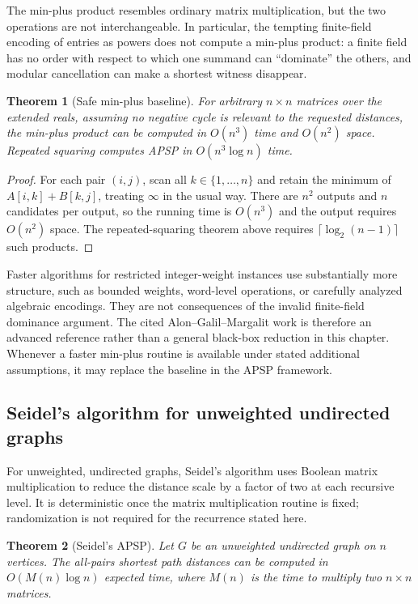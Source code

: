 \documentclass[twoside,12pt]{book}
\theoremstyle{plain}
\newtheorem{theorem}{Theorem}[chapter]
\theoremstyle{definition}
\theoremstyle{remark}
\begin{document}
The min-plus product resembles ordinary matrix multiplication, but the two
operations are not interchangeable. In particular, the tempting finite-field
encoding of entries as powers does not compute a min-plus product: a finite
field has no order with respect to which one summand can ``dominate'' the
others, and modular cancellation can make a shortest witness disappear.

\begin{theorem}[Safe min-plus baseline]
\label{thm:min-plus-baseline}
For arbitrary $n\times n$ matrices over the extended reals, assuming no
negative cycle is relevant to the requested distances, the min-plus product
can be computed in $O(n^3)$ time and $O(n^2)$ space. Repeated squaring
computes APSP in $O(n^3\log n)$ time.
\end{theorem}

\begin{proof}
For each pair $(i,j)$, scan all $k\in\{1,\ldots,n\}$ and retain the
minimum of $A[i,k]+B[k,j]$, treating $\infty$ in the usual way. There are
$n^2$ outputs and $n$ candidates per output, so the running time is
$O(n^3)$ and the output requires $O(n^2)$ space. The repeated-squaring
theorem above requires $\lceil\log_2(n-1)\rceil$ such products.
\end{proof}

Faster algorithms for restricted integer-weight instances use substantially
more structure, such as bounded weights, word-level operations, or carefully
analyzed algebraic encodings. They are not consequences of the invalid
finite-field dominance argument. The cited Alon--Galil--Margalit work is
therefore an advanced reference rather than a general black-box reduction in
this chapter. Whenever a faster min-plus routine is available under stated
additional assumptions, it may replace the baseline in the APSP framework.

\subsection{Seidel's algorithm for unweighted undirected graphs}

For unweighted, undirected graphs, Seidel's algorithm uses Boolean matrix
multiplication to reduce the distance scale by a factor of two at each
recursive level. It is deterministic once the matrix multiplication routine
is fixed; randomization is not required for the recurrence stated here.

\begin{theorem}[Seidel's APSP]
\label{thm:seidel-apsp}
Let $G$ be an unweighted undirected graph on $n$ vertices. The all-pairs shortest path distances can be computed in $O(M(n) \log n)$ expected time, where $M(n)$ is the time to multiply two $n \times n$ matrices.
\end{theorem}
\end{document}
